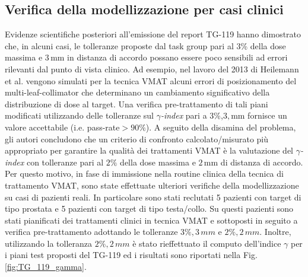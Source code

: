 \subsection{Verifica della modellizzazione per casi clinici}
Evidenze scientifiche posteriori all'emissione del report TG-119 hanno dimostrato che, in alcuni casi, le tolleranze proposte dal task group pari al 3\% della dose massima e $3\,$mm in distanza di accordo possano essere poco sensibili ad errori rilevanti dal punto di vista clinico. Ad esempio, nel lavoro del 2013 di Heilemann et al.\cite{Heilemann2013} vengono simulati per la tecnica VMAT alcuni errori di posizionamento del multi-leaf-collimator che determinano un cambiamento significativo della distribuzione di dose al target. Una verifica pre-trattamento di tali piani modificati utilizzando delle tolleranze sul $\gamma$\textit{-index} pari a 3\%,$3,$mm fornisce un valore accettabile (i.e. pass-rate$> 90\%$). A seguito della disamina del problema, gli autori concludono che un criterio di confronto calcolato/misurato più appropriato per garantire la qualità dei trattamenti VMAT è la valutazione del $\gamma$\textit{-index} con tolleranze pari al $2\%$ della dose massima e $2\,$mm di distanza di accordo. Per questo motivo, in fase di immissione nella routine clinica della tecnica di trattamento VMAT, sono state effettuate ulteriori verifiche della modellizzazione su casi di pazienti reali. In particolare sono stati reclutati 5 pazienti con target di tipo prostata e 5 pazienti con target di tipo testa/collo. Su questi pazienti sono stati pianificati dei trattamenti clinici in tecnica VMAT e sottoposti in seguito a verifica pre-trattamento adottando le tolleranze $3\%,3\,mm$ e $2\%,2\,mm$. Inoltre, utilizzando la tolleranza $2\%,2\,mm$ è stato rieffettuato il computo dell'indice $\gamma$ per i piani test proposti del TG-119 ed i risultati sono riportati nella Fig.\ref{fig:TG_119_gamma}.

